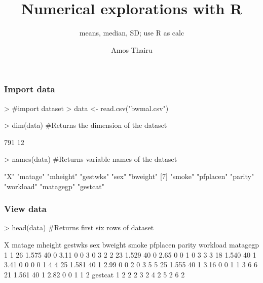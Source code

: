 \documentclass{beamer}
\title{Numerical explorations with R}
\subtitle{means, median, SD; use R as calc}
\author{Amos Thairu}
\begin{document}

\begin{frame}
\titlepage
\end{frame}

\begin{frame}[fragile]\frametitle{Import data}
\begin{Schunk}
\begin{Sinput}
> #import dataset
> data <- read.csv("bwmal.csv")
\end{Sinput}
\end{Schunk}
\pause
\begin{Schunk}
\begin{Sinput}
> dim(data) #Returns the dimension of the dataset
\end{Sinput}
\begin{Soutput}
[1] 791  12
\end{Soutput}
\end{Schunk}
\pause
\begin{Schunk}
\begin{Sinput}
> names(data) #Returns variable names of the dataset
\end{Sinput}
\begin{Soutput}
 [1] "X"        "matage"   "mheight"  "gestwks"  "sex"      "bweight" 
 [7] "smoke"    "pfplacen" "parity"   "workload" "matagegp" "gestcat" 
\end{Soutput}
\end{Schunk}
\end{frame}

\begin{frame}[fragile]\frametitle{View data}
\begin{Schunk}
\begin{Sinput}
> head(data) #Returns first six rows of dataset
\end{Sinput}
\begin{Soutput}
  X matage mheight gestwks sex bweight smoke pfplacen parity workload matagegp
1 1     26   1.575      40   0    3.11     0        0      3        0        3
2 2     23   1.529      40   0    2.65     0        0      1        0        3
3 3     18   1.540      40   1    3.41     0        0      0        0        1
4 4     25   1.581      40   1    2.99     0        0      2        0        3
5 5     25   1.555      40   1    3.16     0        0      1        1        3
6 6     21   1.561      40   1    2.82     0        0      1        1        2
  gestcat
1       2
2       2
3       2
4       2
5       2
6       2
\end{Soutput}
\end{Schunk}
\end{frame}
\end{document}
